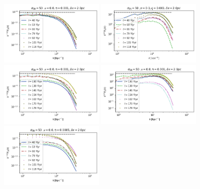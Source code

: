 \documentclass[iop,apj,numberedappendix,twocolappendix]{emulateapj}
\begin{document}
\begin{figure}
\centering
\includegraphics[trim=0.0cm 0.00cm 0.0cm 0.0cm,clip=true,width=0.45\textwidth]{csc_figs/2pcPm0e-3_0Bpower.png}
\includegraphics[trim=0.0cm 0.00cm 0.0cm 0.0cm,clip=true,width=0.45\textwidth]{csc_figs/2pcPm0e-3_0kpower.png}
\includegraphics[trim=0.0cm 0.00cm 0.0cm 0.0cm,clip=true,width=0.45\textwidth]{csc_figs/2pcPm0e-3_aBpower.png}
\includegraphics[trim=0.0cm 0.00cm 0.0cm 0.0cm,clip=true,width=0.45\textwidth]{csc_figs/2pcPm0e-3_akpower.png}
\includegraphics[trim=0.0cm 0.00cm 0.0cm 0.0cm,clip=true,width=0.45\textwidth]{csc_figs/2pcPm0e-3_3Bpower.png}

\end{figure}
\end{document}
